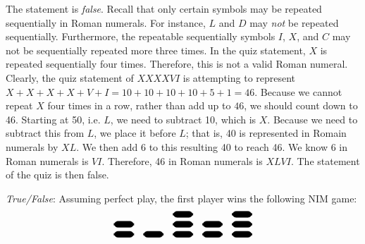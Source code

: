 \documentclass[11pt,letterpaper]{article}
\begin{document}
\sol The statement is \textit{false}. Recall that only certain symbols may be repeated sequentially in Roman numerals. For instance, $L$ and $D$ may \textit{not} be repeated sequentially. Furthermore, the repeatable sequentially symbols $I$, $X$, and $C$ may not be sequentially repeated more three times. In the quiz statement, $X$ is repeated sequentially four times. Therefore, this is not a valid Roman numeral. Clearly, the quiz statement of $X\!X\!X\!X\!V\!I$ is attempting to represent $X + X + X + X + V + I= 10 + 10 + 10 + 10 + 5 + 1= 46$. Because we cannot repeat $X$ four times in a row, rather than add up to $46$, we should count down to 46. Starting at 50, i.e. $L$, we need to subtract 10, which is $X$. Because we need to subtract this from $L$, we place it before $L$; that is, 40 is represented in Romain numerals by $X\!L$. We then add 6 to this resulting 40 to reach 46. We know 6 in Roman numerals is $V\!I$. Therefore, 46 in Roman numerals is $X\!LV\!I$. The statement of the quiz is then false. \pvspace{1.3cm}



\quizsol \textit{True/False}: Assuming perfect play, the first player wins the following NIM game:
	\[
	\begin{tikzpicture}[scale=0.7]
	\draw[rounded corners,fill=black] (0,0) rectangle (1,0.3);
	\draw[rounded corners,fill=black] (0,0.5) rectangle (1,0.8);
	\draw[rounded corners,fill=black] (1.5,0) rectangle (2.5,0.3);
	\draw[rounded corners,fill=black] (3,0) rectangle (4,0.3);
	\draw[rounded corners,fill=black] (3,0.5) rectangle (4,0.8);
	\draw[rounded corners,fill=black] (3,1) rectangle (4,1.3);	
	\draw[rounded corners,fill=black] (4.5,0) rectangle (5.5,0.3);
	\draw[rounded corners,fill=black] (4.5,0.5) rectangle (5.5,0.8);	
	\draw[rounded corners,fill=black] (6,0) rectangle (7,0.3);
	\draw[rounded corners,fill=black] (6,0.5) rectangle (7,0.8);
	\draw[rounded corners,fill=black] (6,1) rectangle (7,1.3);	
	\end{tikzpicture}
	\]
\end{document}
